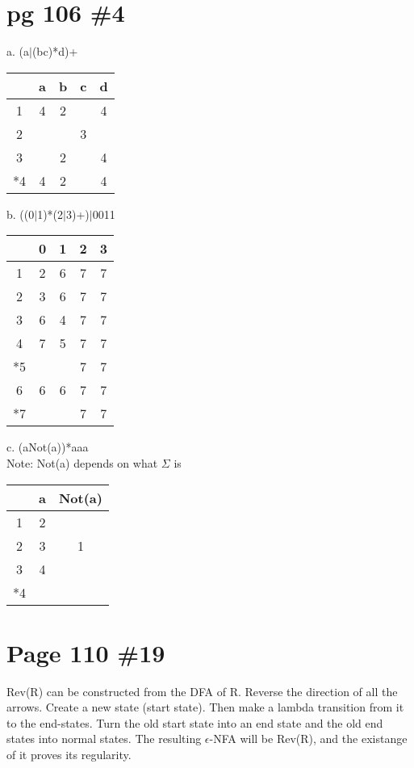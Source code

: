 \documentclass[11pt]{article}
\begin{document}
\section{pg 106 \#4}
    a. (a$\mid$(bc)*d)+ \\
    \begin{tabular}{|c|c|c|c|c|}
  \hline  & a & b & c & d \\ \hline
        1 & 4 & 2 &   & 4 \\ \hline
        2 &   &   & 3 &   \\ \hline
        3 &   & 2 &   & 4 \\ \hline
       *4 & 4 & 2 &   & 4 \\ \hline
    \end{tabular}

    b. ((0$\mid$1)*(2$\mid$3)+)$\mid$0011 \\
    \begin{tabular}{|c|c|c|c|c|}
   \hline & 0 & 1 & 2 & 3 \\ \hline
        1 & 2 & 6 & 7 & 7 \\ \hline
        2 & 3 & 6 & 7 & 7 \\ \hline
        3 & 6 & 4 & 7 & 7 \\ \hline
        4 & 7 & 5 & 7 & 7 \\ \hline
       *5 &   &   & 7 & 7 \\ \hline
        6 & 6 & 6 & 7 & 7 \\ \hline
       *7 &   &   & 7 & 7 \\ \hline
    \end{tabular}

    c. (aNot(a))*aaa \\
        Note: Not(a) depends on what $\Sigma$ is \\
    \begin{tabular}{|c|c|c|}
  \hline  & a & Not(a) \\ \hline
        1 & 2 &   \\ \hline
        2 & 3 & 1 \\ \hline
        3 & 4 &   \\ \hline
       *4 &   &   \\ \hline
    \end{tabular}
\section{Page 110 \#19}
    Rev(R) can be constructed from the DFA of R.
    Reverse the direction of all the arrows.
    Create a new state (start state). Then make a lambda transition from it to the end-states.
    Turn the old start state into an end state and the old end states into normal states.
    The resulting $\epsilon$-NFA will be Rev(R), and the existange of it proves its regularity.
\end{document}
